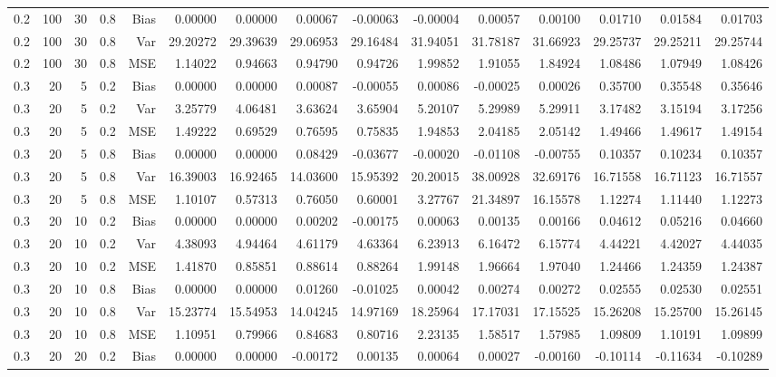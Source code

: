 \begin{table}[!htbp]
\begin{tabular}{lrrrrrrrrrrrrrr}
0.2 & 100 & 30 & 0.8 & Bias & 0.00000 & 0.00000 & 0.00067 & -0.00063 & -0.00004 & 0.00057 & 0.00100 & 0.01710 & 0.01584 & 0.01703 \\
0.2 & 100 & 30 & 0.8 & Var & 29.20272 & 29.39639 & 29.06953 & 29.16484 & 31.94051 & 31.78187 & 31.66923 & 29.25737 & 29.25211 & 29.25744 \\
0.2 & 100 & 30 & 0.8 & MSE & 1.14022 & 0.94663 & 0.94790 & 0.94726 & 1.99852 & 1.91055 & 1.84924 & 1.08486 & 1.07949 & 1.08426 \\
0.3 &  20 &  5 & 0.2 & Bias & 0.00000 & 0.00000 & 0.00087 & -0.00055 & 0.00086 & -0.00025 & 0.00026 & 0.35700 & 0.35548 & 0.35646 \\
0.3 &  20 &  5 & 0.2 & Var & 3.25779 & 4.06481 & 3.63624 & 3.65904 & 5.20107 & 5.29989 & 5.29911 & 3.17482 & 3.15194 & 3.17256 \\
0.3 &  20 &  5 & 0.2 & MSE & 1.49222 & 0.69529 & 0.76595 & 0.75835 & 1.94853 & 2.04185 & 2.05142 & 1.49466 & 1.49617 & 1.49154 \\
0.3 &  20 &  5 & 0.8 & Bias & 0.00000 & 0.00000 & 0.08429 & -0.03677 & -0.00020 & -0.01108 & -0.00755 & 0.10357 & 0.10234 & 0.10357 \\
0.3 &  20 &  5 & 0.8 & Var & 16.39003 & 16.92465 & 14.03600 & 15.95392 & 20.20015 & 38.00928 & 32.69176 & 16.71558 & 16.71123 & 16.71557 \\
0.3 &  20 &  5 & 0.8 & MSE & 1.10107 & 0.57313 & 0.76050 & 0.60001 & 3.27767 & 21.34897 & 16.15578 & 1.12274 & 1.11440 & 1.12273 \\
0.3 &  20 & 10 & 0.2 & Bias & 0.00000 & 0.00000 & 0.00202 & -0.00175 & 0.00063 & 0.00135 & 0.00166 & 0.04612 & 0.05216 & 0.04660 \\
0.3 &  20 & 10 & 0.2 & Var & 4.38093 & 4.94464 & 4.61179 & 4.63364 & 6.23913 & 6.16472 & 6.15774 & 4.44221 & 4.42027 & 4.44035 \\
0.3 &  20 & 10 & 0.2 & MSE & 1.41870 & 0.85851 & 0.88614 & 0.88264 & 1.99148 & 1.96664 & 1.97040 & 1.24466 & 1.24359 & 1.24387 \\
0.3 &  20 & 10 & 0.8 & Bias & 0.00000 & 0.00000 & 0.01260 & -0.01025 & 0.00042 & 0.00274 & 0.00272 & 0.02555 & 0.02530 & 0.02551 \\
0.3 &  20 & 10 & 0.8 & Var & 15.23774 & 15.54953 & 14.04245 & 14.97169 & 18.25964 & 17.17031 & 17.15525 & 15.26208 & 15.25700 & 15.26145 \\
0.3 &  20 & 10 & 0.8 & MSE & 1.10951 & 0.79966 & 0.84683 & 0.80716 & 2.23135 & 1.58517 & 1.57985 & 1.09809 & 1.10191 & 1.09899 \\
0.3 &  20 & 20 & 0.2 & Bias & 0.00000 & 0.00000 & -0.00172 & 0.00135 & 0.00064 & 0.00027 & -0.00160 & -0.10114 & -0.11634 & -0.10289 \\

\end{tabular}
\end{table}
